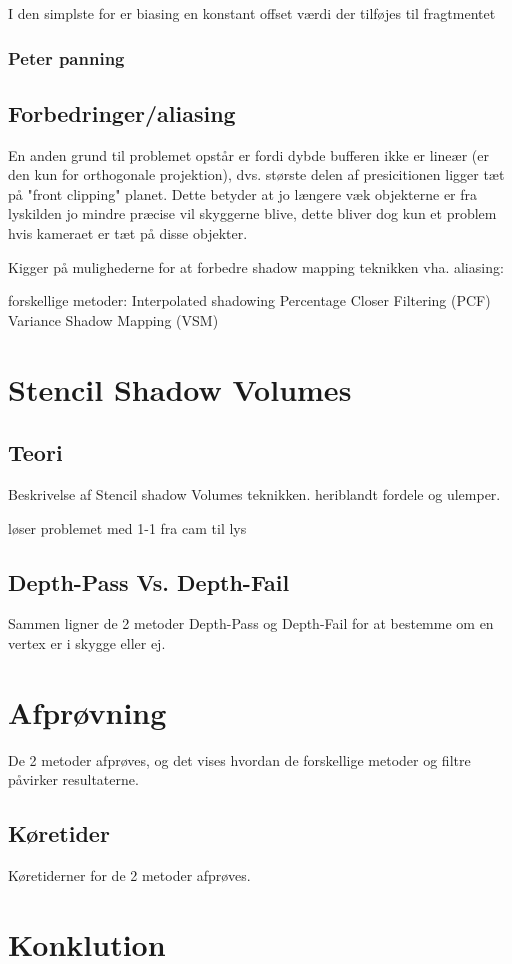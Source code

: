 \documentclass[11pt,a4paper]{article}
\begin{document}
I den simplste for er biasing en konstant offset værdi der tilføjes til fragtmentet

 





\subsubsection{Peter panning}


\subsection{Forbedringer/aliasing}

En anden grund til problemet opstår er fordi dybde bufferen ikke er lineær (er den kun for orthogonale projektion), dvs. største delen af presicitionen ligger tæt på "front clipping" planet. Dette betyder at jo længere væk objekterne er fra lyskilden jo mindre præcise vil skyggerne blive, dette bliver dog kun et problem hvis kameraet er tæt på disse objekter. 

Kigger på mulighederne for at forbedre shadow mapping teknikken vha. aliasing:

forskellige metoder:
Interpolated shadowing
Percentage Closer Filtering (PCF)
Variance Shadow Mapping (VSM)


\section{Stencil Shadow Volumes}

\subsection{Teori}
Beskrivelse af Stencil shadow Volumes teknikken. heriblandt fordele og ulemper.

løser problemet med 1-1 fra cam til lys

\subsection{Depth-Pass Vs. Depth-Fail}
Sammen ligner de 2 metoder Depth-Pass og Depth-Fail for at bestemme om en vertex er i skygge eller ej.


\section{Afprøvning}
 De 2 metoder afprøves, og det vises hvordan de forskellige metoder og filtre påvirker resultaterne.	

\subsection{Køretider}
Køretiderner for de 2 metoder afprøves.

\section{Konklution}
\end{document}

